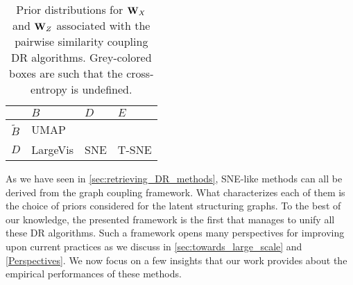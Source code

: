 \begin{table}[]
    \caption{Prior distributions for ${\mathbf{W}}_{X}$ and ${\mathbf{W}}_{Z}$ associated with the pairwise similarity coupling DR algorithms. Grey-colored boxes are such that the cross-entropy is undefined.}
    \begin{center}
    \begin{small}
    \begin{sc}
    \centering
    \renewcommand{\arraystretch}{2}
    \begin{NiceTabular}{|W{c}{1cm}|W{c}{1.8cm}|W{c}{1.8cm}|W{c}{1.8cm}|}
    \hline
     & $B$ & $D$ & $E$ \\
    \hline
    $\widetilde{B}$ & UMAP &  &  \\
    \hline
    $D$ & LargeVis & SNE & T-SNE\\
    \hline
    \end{NiceTabular}
    \label{tableau_priors}
    \end{sc}
    \end{small}
    \end{center}
    \label{priors_methods}
\end{table}

As we have seen in \cref{sec:retrieving_DR_methods}, SNE-like methods can all be derived from the graph coupling framework.  What characterizes each of them is the choice of priors considered for the latent structuring graphs. To the best of our knowledge, the presented framework is the first that manages to unify all these DR algorithms. Such a framework opens many perspectives for improving upon current practices as we discuss in \cref{sec:towards_large_scale} and \cref{Perspectives}. 
We now focus on a few insights that our work provides about the empirical performances of these methods. 


